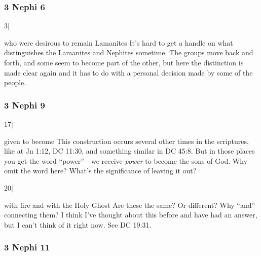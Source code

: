 	\subsubsection{3 Nephi 6} %
	
		\begin{compactdesc}
		
		\item[3$\vert$]
		\begin{compactdesc}
		\item[who were desirous to remain Lamanites] It's hard to get a handle on what distinguishes the Lamanites and Nephites sometime. The groups move back and forth, and some seem to become part of the other, but here the distinction is made clear again and it has to do with a personal decision made by some of the people.
		\end{compactdesc}
		
		\end{compactdesc}
		
	\subsubsection{3 Nephi 9} %
	
		\begin{compactdesc}
		
		\item[17$\vert$]
		\begin{compactdesc}
		\item[given to become] This construction occurs several other times in the scriptures, like at Jn 1:12, DC 11:30, and something similar in DC 45:8. But in those places you get the word ``power''---we receive \textit{power} to become the sons of God. Why omit the word here? What's the significance of leaving it out?
		\end{compactdesc}
		
		\item[20$\vert$]
		\begin{compactdesc}
		\item[with fire and with the Holy Ghost] Are these the same? Or different? Why ``and'' connecting them? I think I've thought about this before and have had an answer, but I can't think of it right now. See DC 19:31.
		\end{compactdesc}
		
		\end{compactdesc}
		
	\subsubsection{3 Nephi 11} %
	
